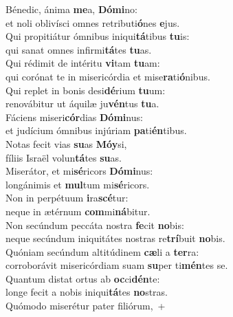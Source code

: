 \evenverse Bénedic, ánima \textbf{me}a, \textbf{Dó}\textbf{mi}no:~\*\\
\evenverse et noli oblivísci omnes retributi\textbf{ó}nes \textbf{e}jus.\\
\oddverse Qui propitiátur ómnibus iniqui\textbf{tá}tibus \textbf{tu}is:~\*\\
\oddverse qui sanat omnes infirmi\textbf{tá}tes \textbf{tu}as.\\
\evenverse Qui rédimit de intéritu \textbf{vi}tam \textbf{tu}am:~\*\\
\evenverse qui corónat te in misericórdia et mise\textbf{ra}ti\textbf{ó}nibus.\\
\oddverse Qui replet in bonis desi\textbf{dé}rium \textbf{tu}um:~\*\\
\oddverse renovábitur ut áquilæ ju\textbf{vén}tus \textbf{tu}a.\\
\evenverse Fáciens miseri\textbf{cór}dias \textbf{Dó}\textbf{mi}nus:~\*\\
\evenverse et judícium ómnibus injúriam \textbf{pa}ti\textbf{én}tibus.\\
\oddverse Notas fecit vias \textbf{su}as \textbf{Mó}\textbf{y}si,~\*\\
\oddverse fíliis Israël volun\textbf{tá}tes \textbf{su}as.\\
\evenverse Miserátor, et mi\textbf{sé}ricors \textbf{Dó}\textbf{mi}nus:~\*\\
\evenverse longánimis et \textbf{mul}tum mi\textbf{sé}ricors.\\
\oddverse Non in perpétuum \textbf{i}ra\textbf{scé}tur:~\*\\
\oddverse neque in ætérnum \textbf{com}mi\textbf{ná}bitur.\\
\evenverse Non secúndum peccáta nostra \textbf{fe}cit \textbf{no}bis:~\*\\
\evenverse neque secúndum iniquitátes nostras re\textbf{trí}buit \textbf{no}bis.\\
\oddverse Quóniam secúndum altitúdinem \textbf{cæ}li a \textbf{ter}ra:~\*\\
\oddverse corroborávit misericórdiam suam \textbf{su}per ti\textbf{mén}tes se.\\
\evenverse Quantum distat ortus ab \textbf{oc}ci\textbf{dén}te:~\*\\
\evenverse longe fecit a nobis iniqui\textbf{tá}tes \textbf{no}stras.\\
\oddverse Quómodo miserétur pater filiórum,~+\\
